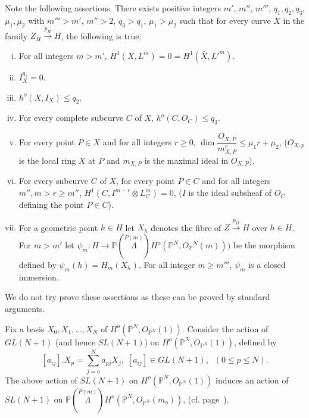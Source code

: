 Note the following assertions. There exists positive integers $m'$, 
$m''$,  $m'''$, $q_1,q_2,q_3$, $\mu_1, \mu_2$ with $m''' > m'$, $m''>2$, $q_3
> q_1$, $\mu_1 > \mu_2$ such that for every curve $X$ in the family $Z_H
\xrightarrow{p_H} H$, the following is true:  
\begin{enumerate}[i)]
\item For all integers $ m > m'$, $H^1 (X, L^m) = 0 = H^1 (\bar{X},{L'}^m )$.

\item $I_X^{q_1} = 0$.

\item $h^o (X, I_X) \le q_2$.\label{c1:as3}\pageoriginale

\item For every complete subcurve $C$ of $X$, $h^o (C, O_C) \le q_3$.\label{c1:as4}

\item For every point $P \in X $ and for all integers  $r \ge 0$, $\dim
  \dfrac{O_{X,P}}{m^r_{X,P}} \le \mu_1 r + \mu_2$, ($O_{X,p}$ is the local
  ring $X$ at $P$ and $m_{X,P}$ is the maximal ideal in $O_{X,P}$).\label{c1:as5} 

\item For every subcurve $C$ of $X$, for every point $P \in C$\label{c1:as6}
  and for all integers $m'', m > r \ge m''$, $H^1 (C,I^{m-r} \otimes
  L_C^m) = 0$, ($I$ is the ideal subsheaf of  $O_C$ defining the point 
  $P \in C$). 

 \item For a geometric point $h \in H$ let $X_h$ denotes the fibre of
   $Z \xrightarrow{p_H} H$ over $h \in H$. For $ m>m'$ let  $\psi_m:
   H \to \mathbb{P} (\overset{P(m)} \Lambda)  H^o (\mathbb{P}^N, O
   {_{\mathbb{P}}{^N}} (m)))$  be the morphism defined by $\psi_m (h)
   = H_m (X_h)$. For all integer  $m \ge m'''$, $\psi_m$ is a closed
   immersion.\label{c1:cl.immersion}  
\end{enumerate}

We do not try prove these assertions as these can be proved by
standard arguments. 

Fix a basis $X_0, X_1 ,\ldots, X_N$ of $H^o (\mathbb{P}^N, O_{
  \mathbb{P}^N} (1))$.  Consider the action of $GL(N+1)$ (and
hence $SL(N+1)$) on $H^o (\mathbb{P}^N, O_{\mathbb{P}^N} (1))$,
defined by 
$$
[a_{ij}].X_p =\sum_{j=o}^N a_{pj} X_j, \; [a_{ij}] \in 
GL(N+1), \;\; (0 \le p \le N).  
$$
The above action of $SL(N+1)$ on $H^o (\mathbb{P}^N, O_{
  \mathbb{P}^N} (1))$ induces an action of $SL(N+1)$ on
$\mathbb{P} (\overset{P(m)} \Lambda)  H^o (\mathbb{P}^N,
O_{\mathbb{P}^N} (m_o))$, (cf. page~\pageref{c0:l(n+1)}).  

